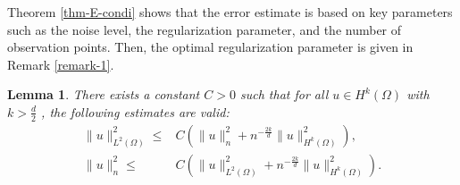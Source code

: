 \documentclass[11pt]{article}
\newtheorem{lemma}{Lemma}[section]
\numberwithin{equation}{section}
\begin{document}
Theorem \ref{thm-E-condi} shows that the error estimate is based on key parameters
such as the noise level, the regularization parameter, and the number of observation points.
Then, the optimal regularization parameter is given in Remark \ref{remark-1}.

\begin{lemma}\cite[Theorems 3.3 and 3.4]{utreras1988convergence}
\label{lem-u-un}
There exists a constant  $C>0$  such that for all  $  u \in H^k(\Omega)$ with $k>\frac{d}2$ , the following estimates are valid:
\begin{equation}\label{esti-u<un}
\begin{aligned}
\| u \|^2_{L^2(\Omega)} \leq& C \left( \| u \|^2_n + n^{-\frac{2k}{d}} \| u \|^2_{H^k(\Omega)} \right),\\
\| u \|^2_n \leq& C \left( \| u \|^2_{L^2(\Omega)} + n^{-\frac{2k}{d}} \| u \|^2_{H^k(\Omega)} \right). 
\end{aligned}
\end{equation}
\end{lemma}
\end{document}
